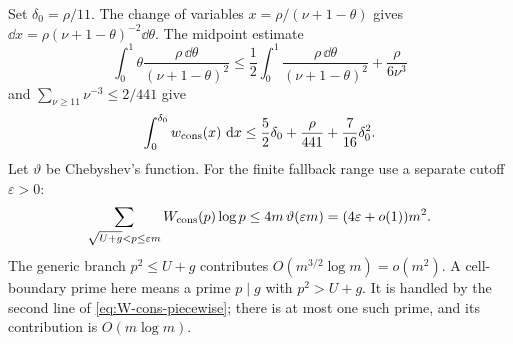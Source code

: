 Set $\delta_0=\rho/11$. The change of variables
$x=\rho/(\nu+1-\theta)$ gives
$\dd x=\rho(\nu+1-\theta)^{-2}\dd\theta$. The midpoint estimate
\[
 \int_0^1\theta\frac{\rho\,\dd\theta}{(\nu+1-\theta)^2}
 \le \frac12\int_0^1\frac{\rho\,\dd\theta}{(\nu+1-\theta)^2}
      +\frac{\rho}{6\nu^3}
\]
and $\sum_{\nu\ge11}\nu^{-3}\le2/441$ give
\begin{equation}
 \int_0^{\delta_0} w_{\rm cons}(x)\,\,\mathrm d x
 \le\frac52\delta_0+\frac{\rho}{441}+\frac7{16}\delta_0^2.   \label{eq:16a}
\end{equation}
Let $\vartheta$ be Chebyshev's function. For the finite fallback range use a
separate cutoff $\varepsilon>0$:
\begin{equation}
 \sum_{\sqrt{U+g}<p\le\varepsilon m}W_{\rm cons}(p)\log p
 \le4m\,\vartheta(\varepsilon m)
 =(4\varepsilon+o(1))m^2.                                \label{eq:16b}
\end{equation}
The generic branch $p^2\le U+g$ contributes
$O(m^{3/2}\log m)=o(m^2)$. A cell-boundary prime here means a prime
$p\mid g$ with $p^2>U+g$. It is handled by the second line of
\eqref{eq:W-cons-piecewise}; there is at most one such prime, and its
contribution is $O(m\log m)$.

